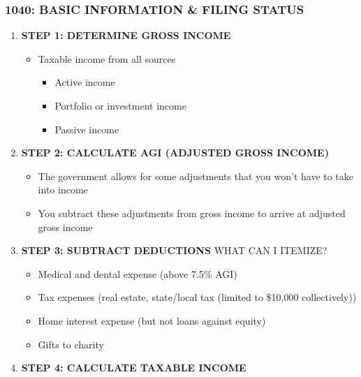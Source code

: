 \documentclass[12pt]{article}
\begin{document}
            \subsubsection{1040: BASIC INFORMATION \& FILING STATUS}
                \begin{enumerate}
                    \item \textbf{STEP 1: DETERMINE GROSS INCOME}
                        \begin{itemize}
                            \item Taxable income from all sources
                                \begin{itemize}
                                    \item Active income
                                    \item Portfolio or investment income
                                    \item Passive income
                                \end{itemize}
                        \end{itemize}
                    \item \textbf{STEP 2: CALCULATE AGI (ADJUSTED GROSS INCOME)}
                        \begin{itemize}
                            \item The government allows for some adjustments that you won't have to take into income
                            \item You subtract these adjustments from gross income to arrive at adjusted gross income
                        \end{itemize}
                    \item \textbf{STEP 3: SUBTRACT DEDUCTIONS}
                        WHAT CAN I ITEMIZE?
                        \begin{itemize}
                            \item Medical and dental expense (above 7.5\% AGI)
                            \item Tax expenses (real estate, state/local tax (limited to \$10,000 collectively))
                            \item Home interest expense (but not loans against equity)
                            \item Gifts to charity
                        \end{itemize}
                    \item \textbf{STEP 4: CALCULATE TAXABLE INCOME}

\end{enumerate}
\end{document}
